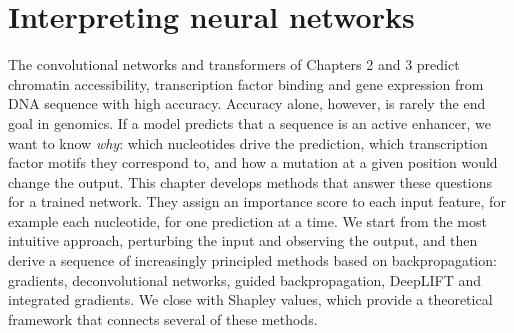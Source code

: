 
\providecommand{\R}{\mathbb{R}}
\providecommand{\E}{\mathbb{E}}
\providecommand{\Normal}{\mathcal{N}}
\providecommand{\argmax}{\operatorname*{arg\,max}}
\providecommand{\argmin}{\operatorname*{arg\,min}}
\providecommand{\vy}{\mathbf{y}}
\providecommand{\vx}{\mathbf{x}}
\providecommand{\mX}{\mathbf{X}}
\providecommand{\mI}{\mathbf{I}}
\providecommand{\vb}{\boldsymbol{\beta}}
\providecommand{\veps}{\boldsymbol{\epsilon}}
\providecommand{\vp}{\mathbf{p}}
\providecommand{\vg}{\mathbf{g}}
\providecommand{\ind}{\mathbf{1}}
\providecommand{\vz}{\mathbf{z}}
\providecommand{\vh}{\mathbf{h}}
\providecommand{\vw}{\mathbf{w}}
\providecommand{\vs}{\mathbf{s}}
\providecommand{\ve}{\mathbf{e}}
\providecommand{\mW}{\mathbf{W}}
\providecommand{\relu}{\operatorname{ReLU}}
\providecommand{\IG}{\operatorname{IG}}


\providecommand{\chaptertoc}{}
\chapter{Interpreting neural networks}
\label{ch:interpretation}
\chaptertoc

The convolutional networks and transformers of Chapters 2 and 3 predict chromatin accessibility, transcription factor binding and gene expression from DNA sequence with high accuracy. Accuracy alone, however, is rarely the end goal in genomics. If a model predicts that a sequence is an active enhancer, we want to know \emph{why}: which nucleotides drive the prediction, which transcription factor motifs they correspond to, and how a mutation at a given position would change the output. This chapter develops methods that answer these questions for a trained network. They assign an importance score to each input feature, for example each nucleotide, for one prediction at a time. We start from the most intuitive approach, perturbing the input and observing the output, and then derive a sequence of increasingly principled methods based on backpropagation: gradients, deconvolutional networks, guided backpropagation, DeepLIFT and integrated gradients. We close with Shapley values, which provide a theoretical framework that connects several of these methods.

